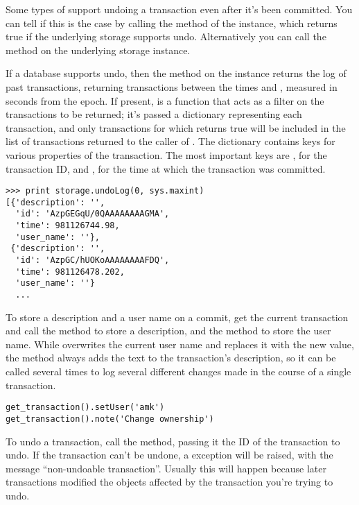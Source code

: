 Some types of  support undoing a transaction even after
it's been committed.  You can tell if this is the case by calling the
 method of the  instance, which
returns true if the underlying storage supports undo.  Alternatively
you can call the  method on the underlying
storage instance.

If a database supports undo, then the  method on the  instance returns
the log of past transactions, returning transactions between the times
 and , measured in seconds from the epoch.   
If present,  is a function that acts as a filter on the
transactions to be returned; it's passed a dictionary representing
each transaction, and only transactions for which  returns
true will be included in the list of transactions returned to the
caller of .  The dictionary contains keys for
various properties of the transaction.  The most important keys are
, for the transaction ID, and , for the time at
which the transaction was committed.  

\begin{verbatim}
>>> print storage.undoLog(0, sys.maxint)
[{'description': '',
  'id': 'AzpGEGqU/0QAAAAAAAAGMA',
  'time': 981126744.98,
  'user_name': ''},
 {'description': '',
  'id': 'AzpGC/hUOKoAAAAAAAAFDQ',
  'time': 981126478.202,
  'user_name': ''}
  ...
\end{verbatim}

To store a description and a user name on a commit, get the current
transaction and call the  method to store a
description, and the
 method to store the user name.  
While  overwrites the current user name and replaces
it with the new value, the  method always adds the text
to the transaction's description, so it can be called several times to
log several different changes made in the course of a single
transaction.

\begin{verbatim}
get_transaction().setUser('amk')
get_transaction().note('Change ownership')
\end{verbatim}

To undo a transaction, call the  method,
passing it the ID of the transaction to undo.  If the transaction
can't be undone, a  exception
will be raised, with the message ``non-undoable
transaction''.  Usually this will happen because later transactions
modified the objects affected by the transaction you're trying to
undo.

